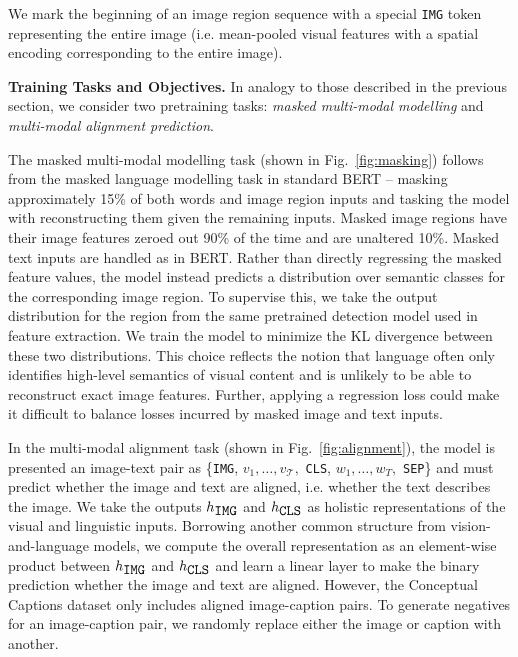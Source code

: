  We mark the beginning of an image region sequence with a special \texttt{IMG} token representing the entire image (i.e. mean-pooled visual features with a spatial encoding corresponding to the entire image).

\textbf{Training Tasks and Objectives.} In analogy to those described in the previous section, we consider two pretraining tasks: \emph{masked multi-modal modelling} and \emph{multi-modal alignment prediction}. 

The masked multi-modal modelling task (shown in Fig.~\ref{fig:masking}) follows from the masked language modelling task in standard BERT -- masking approximately 15\% of both words and image region inputs and tasking the model with reconstructing them given the remaining inputs. Masked image regions have their image features zeroed out 90\% of the time and are unaltered 10\%. Masked text inputs are handled as in BERT. Rather than directly regressing the masked feature values, the model instead predicts a distribution over semantic classes for the corresponding image region. To supervise this, we take the output distribution for the region from the same pretrained detection model used in feature extraction. We train the model to minimize the KL divergence between these two distributions. This choice reflects the notion that language often only identifies high-level semantics of visual content and is unlikely to be able to reconstruct exact image features. Further, applying a regression loss could make it difficult to balance losses incurred by masked image and text inputs.

In the multi-modal alignment task (shown in Fig.~\ref{fig:alignment}), the model is presented an image-text pair as \{\texttt{IMG}, $v_1, \dots, v_\mathcal{T},$ \texttt{CLS}, $w_1, \dots, w_T,$ \texttt{SEP}\} and must predict whether the image and text are aligned, i.e. whether the text describes the image. We take the outputs $h_{\mbox{\texttt{IMG}}}$ and $h_{\mbox{\texttt{CLS}}}$ as holistic representations of the visual and linguistic inputs. Borrowing another common structure from vision-and-language models, we compute the overall representation as an element-wise product between $h_{\mbox{\texttt{IMG}}}$ and $h_{\mbox{\texttt{CLS}}}$ and learn a linear layer to make the binary prediction whether the image and text are aligned. However, the Conceptual Captions \cite{sharma2018conceptual} dataset only includes aligned image-caption pairs. To generate negatives for an image-caption pair, we randomly replace either the image or caption with another. 

